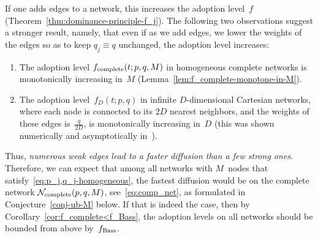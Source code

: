 \documentclass[review]{elsarticle}
\begin{document}
If one adds edges to a network, this increases the adoption level~$f$ (Theorem~\ref{thm:dominance-principle-f_j}). 
The following two observations suggest a stronger result, namely, that
even if as we add edges, we lower the weights of the edges so as to keep $q_j \equiv q$  unchanged, the adoption level increases:
 \begin{enumerate}
 	\item The adoption level $f_{\rm complete}(t;p,q,M)$ in homogeneous complete networks is monotonically increasing in~$M$ (Lemma~\ref{lem:f_complete-monotone-in-M}).
 	
 	\item  The adoption level~$f_D(t;p,q)$ in infinite $D$-dimensional Cartesian networks, where each node is connected to its 
 	$2D$ nearest neighbors, and the weights of these edges  is~$\frac{q}{2D}$,
 	is monotonically increasing in~$D$ (this was shown numerically and asymptotically in~\cite{OR-10}).
 	  
 \end{enumerate}
 Thus,    %
{\em numerous weak edges lead to a faster diffusion than a few strong ones}.
 Therefore, we can expect  that among all networks with $M$~nodes that satisfy~\eqref{eq:p_j,q_j-homogeneous}, the fastest diffusion would be on the complete network ${\cal N}_{\rm complete}(p,q,M)$, see~\eqref{eq:comp_net}, as formulated in Conjecture~\ref{conj-ub-M} below. If that is indeed the case,  then by Corollary~\ref{cor:f_complete<f_Bass}, the adoption levels 
on all networks should be bounded from above by~$f_{\rm Bass}$.
%
%
\end{document}

